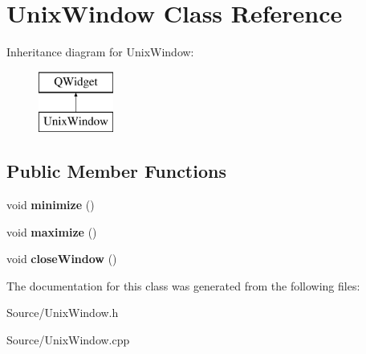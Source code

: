 \hypertarget{class_unix_window}{}\section{Unix\+Window Class Reference}
\label{class_unix_window}
Inheritance diagram for Unix\+Window\+:\begin{figure}[H]
\begin{center}
\leavevmode
\includegraphics[height=2.000000cm]{class_unix_window}
\end{center}
\end{figure}
\subsection*{Public Member Functions}
\begin{DoxyCompactItemize}
\item 
\hypertarget{class_unix_window_a3650eb61cf59c7f01778da4b5057a078}{}void {\bfseries minimize} ()\label{class_unix_window_a3650eb61cf59c7f01778da4b5057a078}

\item 
\hypertarget{class_unix_window_a5d4036ac48b03904ae728d43e3b9eb50}{}void {\bfseries maximize} ()\label{class_unix_window_a5d4036ac48b03904ae728d43e3b9eb50}

\item 
\hypertarget{class_unix_window_a385d71b20907ee4b9c8177628db09764}{}void {\bfseries close\+Window} ()\label{class_unix_window_a385d71b20907ee4b9c8177628db09764}

\end{DoxyCompactItemize}


The documentation for this class was generated from the following files\+:\begin{DoxyCompactItemize}
\item 
Source/Unix\+Window.\+h\item 
Source/Unix\+Window.\+cpp\end{DoxyCompactItemize}
